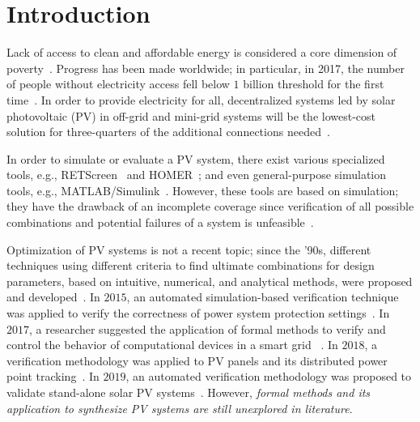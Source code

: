 \documentclass[runningheads]{llncs}
\begin{document}
\section{Introduction}
Lack of access to clean and affordable energy is considered a core dimension of poverty~\cite{Hussein2012}. Progress has been made worldwide; in particular, in 2017, the number of people without electricity access fell below $1$ billion threshold for the first time~\cite{IEAweo2018}. In order to provide electricity for all, decentralized systems led by solar photovoltaic (PV) in off-grid and mini-grid systems will be the lowest-cost solution for three-quarters of the additional connections needed~\cite{Hussein2012}. 

In order to simulate or evaluate a PV system, there exist various specialized tools, e.g., RETScreen~\cite{Pradhan} and HOMER~\cite{Swarnkar}; and even general-purpose simulation tools, e.g., MATLAB/Simulink~\cite{Gow1999}. 
 However, these tools are based on simulation; they have the drawback of an incomplete coverage since verification of all possible combinations and potential failures of a system is unfeasible~\cite{ClarkeHV18}. 

Optimization of PV systems is not a recent topic; since the '90s, different techniques using different criteria to find ultimate combinations for design parameters, based on intuitive, numerical, and analytical methods, were proposed and developed~\cite{Alsadi2018}. In $2015$, an automated simulation-based verification technique was applied to verify the correctness of power system protection settings~\cite{Sengupta2015}. In $2017$, a researcher suggested the application of formal methods to verify and control the behavior of computational devices in a smart grid ~\cite{Abate2017}. In $2018$, a verification methodology was applied to PV panels and its distributed power point tracking~\cite{Driouich2018}. In $2019$, an automated verification methodology was proposed to validate stand-alone solar PV systems~\cite{TrindadeCordeiro19}. However, \textit{formal methods and its application to synthesize PV systems are still unexplored in literature}.
\end{document}
